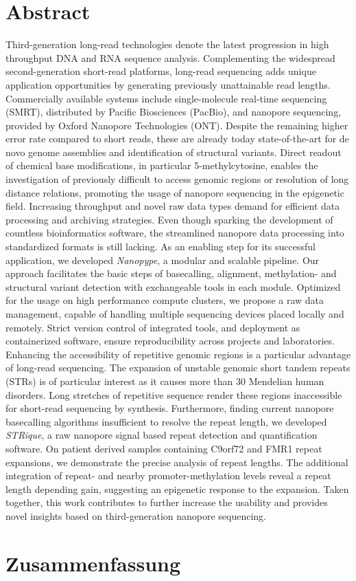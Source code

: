 
\vspace*{10mm}
\section*{Abstract}
\label{sec:abstract}


Third-generation long-read technologies denote the latest progression in high throughput DNA and RNA sequence analysis.
Complementing the widespread second-generation short-read platforms, long-read sequencing adds unique application opportunities by generating previously unattainable read lengths.
Commercially available systems include single-molecule real-time sequencing (SMRT), distributed by Pacific Biosciences (PacBio), and nanopore sequencing, provided by Oxford Nanopore Technologies (ONT).
Despite the remaining higher error rate compared to short reads, these are already today state-of-the-art for de novo genome assemblies and identification of structural variants.
Direct readout of chemical base modifications, in particular 5-methylcytosine, enables the investigation of previously difficult to access genomic regions or resolution of long distance relations, promoting the usage of nanopore sequencing in the epigenetic field.
Increasing throughput and novel raw data types demand for efficient data processing and archiving strategies.
Even though sparking the development of countless bioinformatics software, the streamlined nanopore data processing into standardized formats is still lacking.
As an enabling step for its successful application, we developed \textit{Nanopype}, a modular and scalable pipeline. 
Our approach facilitates the basic steps of basecalling, alignment, methylation- and structural variant detection with exchangeable tools in each module.
Optimized for the usage on high performance compute clusters, we propose a raw data management, capable of handling multiple sequencing devices placed locally and remotely.
Strict version control of integrated tools, and deployment as containerized software, ensure reproducibility across projects and laboratories.
Enhancing the accessibility of repetitive genomic regions is a particular advantage of long-read sequencing.
The expansion of unstable genomic short tandem repeats (STRs) is of particular interest as it causes more than 30 Mendelian human disorders.
Long stretches of repetitive sequence render these regions inaccessible for short-read sequencing by synthesis.
Furthermore, finding current nanopore basecalling algorithms insufficient to resolve the repeat length, we developed \textit{STRique}, a raw nanopore signal based repeat detection and quantification software.
On patient derived samples containing C9orf72 and FMR1 repeat expansions, we demonstrate the precise analysis of repeat lengths.
The additional integration of repeat- and nearby promoter-methylation levels reveal a repeat length depending gain, suggesting an epigenetic response to the expansion.
Taken together, this work contributes to further increase the usability and provides novel insights based on third-generation nanopore sequencing.




\cleardoublepage
\vspace*{10mm}
\section*{Zusammenfassung}
\label{sec:zusammenfassung}



